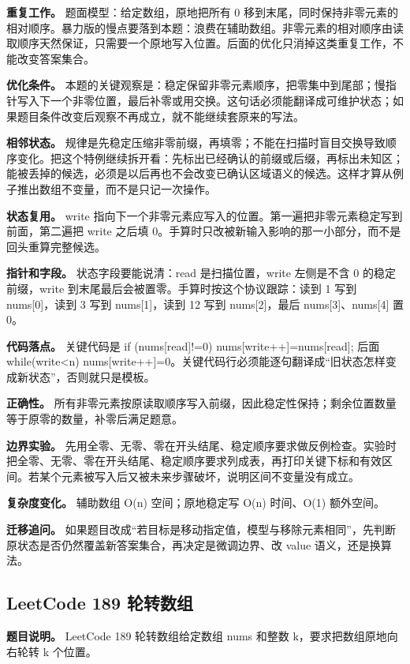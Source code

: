 \textbf{重复工作。} 题面模型：给定数组，原地把所有 0 移到末尾，同时保持非零元素的相对顺序。暴力版的慢点要落到本题：浪费在辅助数组。非零元素的相对顺序由读取顺序天然保证，只需要一个原地写入位置。后面的优化只消掉这类重复工作，不能改变答案集合。

\textbf{优化条件。} 本题的关键观察是：稳定保留非零元素顺序，把零集中到尾部；慢指针写入下一个非零位置，最后补零或用交换。这句话必须能翻译成可维护状态；如果题目条件改变后观察不再成立，就不能继续套原来的写法。

\textbf{相邻状态。} 规律是先稳定压缩非零前缀，再填零；不能在扫描时盲目交换导致顺序变化。把这个特例继续拆开看：先标出已经确认的前缀或后缀，再标出未知区；能被丢掉的候选，必须是以后再也不会改变已确认区域语义的候选。这样才算从例子推出数组不变量，而不是只记一次操作。

\textbf{状态复用。} write 指向下一个非零元素应写入的位置。第一遍把非零元素稳定写到前面，第二遍把 write 之后填 0。手算时只改被新输入影响的那一小部分，而不是回头重算完整候选。

\textbf{指针和字段。} 状态字段要能说清：read 是扫描位置，write 左侧是不含 0 的稳定前缀，write 到末尾最后会被置零。手算时按这个协议跟踪：读到 1 写到 nums[0]，读到 3 写到 nums[1]，读到 12 写到 nums[2]，最后 nums[3]、nums[4] 置 0。

\textbf{代码落点。} 关键代码是 if (nums[read]!=0) nums[write++]=nums[read]; 后面 while(write<n) nums[write++]=0。关键代码行必须能逐句翻译成“旧状态怎样变成新状态”，否则就只是模板。

\textbf{正确性。} 所有非零元素按原读取顺序写入前缀，因此稳定性保持；剩余位置数量等于原零的数量，补零后满足题意。

\textbf{边界实验。} 先用全零、无零、零在开头结尾、稳定顺序要求做反例检查。实验时把全零、无零、零在开头结尾、稳定顺序要求列成表，再打印关键下标和有效区间。若某个元素被写入后又被未来步骤破坏，说明区间不变量没有成立。

\textbf{复杂度变化。} 辅助数组 O(n) 空间；原地稳定写 O(n) 时间、O(1) 额外空间。

\textbf{迁移追问。} 如果题目改成“若目标是移动指定值，模型与移除元素相同”，先判断原状态是否仍然覆盖新答案集合，再决定是微调边界、改 value 语义，还是换算法。

\subsection{LeetCode 189 轮转数组}

\textbf{题目说明。} LeetCode 189 轮转数组给定数组 nums 和整数 k，要求把数组原地向右轮转 k 个位置。

